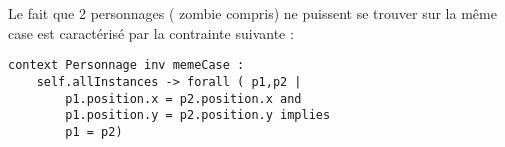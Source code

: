 Le fait que 2 personnages ( zombie compris) ne puissent se trouver sur la même case est caractérisé par la contrainte suivante :

\begin{lstlisting}
context Personnage inv memeCase :
	self.allInstances -> forall ( p1,p2 |
		p1.position.x = p2.position.x and 
		p1.position.y = p2.position.y implies
		p1 = p2)
\end{lstlisting}